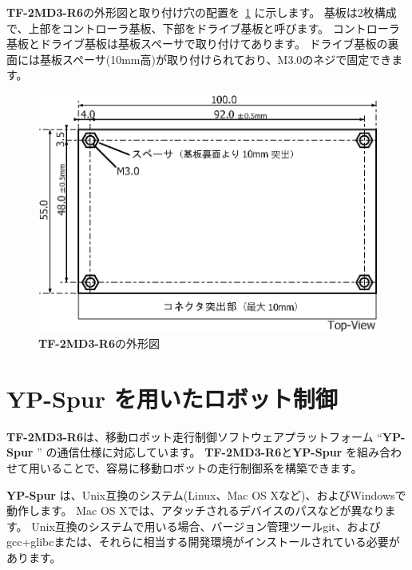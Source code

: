 \documentclass[11pt,a4j,openany,fleqn]{jbook}
\begin{document}
{\bf TF-2MD3-R6}の外形図と取り付け穴の配置を\figurename~\ref{fig:shape} に示します。
基板は2枚構成で、上部をコントローラ基板、下部をドライブ基板と呼びます。
コントローラ基板とドライブ基板は基板スペーサで取り付けてあります。
ドライブ基板の裏面には基板スペーサ(10mm高)が取り付けられており、M3.0のネジで固定できます。

\begin{figure}[H]
\centering\includegraphics[width=130mm]{shape_r6.eps}
\caption{{\bf TF-2MD3-R6}の外形図}
\label{fig:shape}
\end{figure}



\newpage
\section{{\bf YP-Spur} を用いたロボット制御}
\label{sec:YP-Spur}

{\bf TF-2MD3-R6}は、移動ロボット走行制御ソフトウェアプラットフォーム ``{\bf YP-Spur} '' の通信仕様に対応しています。
{\bf TF-2MD3-R6}と{\bf YP-Spur} を組み合わせて用いることで、容易に移動ロボットの走行制御系を構築できます。
\par

{\bf YP-Spur} は、Unix互換のシステム(Linux、Mac OS Xなど)、およびWindowsで動作します。
Mac OS Xでは、アタッチされるデバイスのパスなどが異なります。
Unix互換のシステムで用いる場合、バージョン管理ツールgit、およびgcc+glibcまたは、それらに相当する開発環境がインストールされている必要があります。\par
\end{document}
